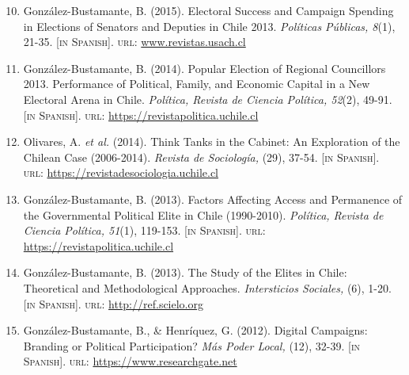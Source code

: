 \documentclass[letterpaper,margin]{res}
\newenvironment{benumerate}[1]{
    \let\oldItem\item
    \def\item{\addtocounter{enumi}{-2}\oldItem}
    \begin{enumerate}
    \setcounter{enumi}{#1}
    \addtocounter{enumi}{1}
}{
    \end{enumerate}
}
\begin{document}
\begin{resume}
\begin{benumerate}{9}
\item{\small Gonz\'alez-Bustamante, B. (2015). Electoral Success and Campaign Spending in Elections of Senators and Deputies in Chile 2013. {\itshape Pol\'iticas P\'ublicas, 8}(1), 21-35. {\footnotesize \scshape [in Spanish]}. {\scshape url}: \href{http://www.revistas.usach.cl/ojs/index.php/politicas/article/view/2182}{www.revistas.usach.cl}}\vspace{1mm}

\item{\small Gonz\'alez-Bustamante, B. (2014). Popular Election of Regional Councillors 2013. Performance of Political, Family, and Economic Capital in a New Electoral Arena in Chile. {\itshape Pol\'itica, Revista de Ciencia Pol\'itica, 52}(2), 49-91. {\footnotesize \scshape [in Spanish]}. {\scshape url}: \href{https://revistapolitica.uchile.cl/index.php/RP/article/view/36137}{https://revistapolitica.uchile.cl}}\vspace{1mm}

\item{\small Olivares, A. {\itshape et al.} (2014). Think Tanks in the Cabinet: An Exploration of the Chilean Case (2006-2014). {\itshape Revista de Sociolog\'ia,} (29), 37-54. {\footnotesize \scshape [in Spanish]}. \\ {\scshape url}: \href{https://revistadesociologia.uchile.cl/index.php/RDS/article/view/36177}{https://revistadesociologia.uchile.cl}}\vspace{1mm}

\item{\small Gonz\'alez-Bustamante, B. (2013). Factors Affecting Access and Permanence of the Governmental Political Elite in Chile (1990-2010). {\itshape Pol\'itica, Revista de Ciencia Pol\'itica, 51}(1), 119-153. {\footnotesize \scshape [in Spanish]}. {\scshape url}: \href{https://revistapolitica.uchile.cl/index.php/RP/article/view/27436}{https://revistapolitica.uchile.cl}}\vspace{1mm}

\item{\small Gonz\'alez-Bustamante, B. (2013). The Study of the Elites in Chile: Theoretical and Methodological Approaches. {\itshape Intersticios Sociales,} (6), 1-20. {\footnotesize \scshape [in Spanish]}. {\scshape url}: \href{http://ref.scielo.org/zrnp2k}{http://ref.scielo.org}}\vspace{1mm}

\item{\small Gonz\'alez-Bustamante, B., \& Henr\'iquez, G. (2012). Digital Campaigns: Branding or Political Participation? {\itshape M\'as Poder Local,} (12), 32-39. {\footnotesize \scshape [in Spanish]}. {\scshape url}: \href{https://www.researchgate.net/publication/260517478_Campanas_digitales_Branding_o_participacion_politica_El_rol_de_las_redes_sociales_en_la_ultima_campana_presidencial_chilena}{https://www.researchgate.net}}
\end{benumerate}


\end{resume}
\end{document}
